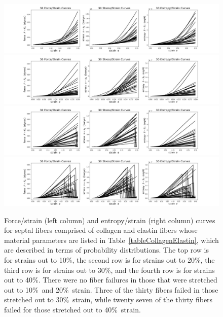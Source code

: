 \begin{figure}
    \includegraphics[width=\textwidth]{figures/septalChords10.jpg}
    \includegraphics[width=\textwidth]{figures/septalChords20.jpg}
    \includegraphics[width=\textwidth]{figures/septalChords30.jpg}
    \includegraphics[width=\textwidth]{figures/septalChords40.jpg}
    \caption{Force\slash strain (left column) and entropy\slash strain (right column) curves for septal fibers comprised of collagen and elastin fibers whose material parameters are listed in Table~\ref{tableCollagenElastin}, which are described in terms of probability distributions.  The top row is for strains out to 10\%, the second row is for strains out to 20\%, the third row is for strains out to 30\%, and the fourth row is for strains out to 40\%.  There were no fiber failures in those that were stretched out to 10\%\ and 20\%\ strain.  Three of the thirty fibers failed in those stretched out to 30\%\ strain, while twenty seven of the thirty fibers failed for those stretched out to 40\%\ strain.}
    \label{figStressStrainFibers}
\end{figure}

